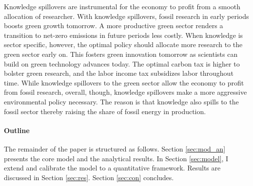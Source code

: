 Knowledge spillovers are instrumental for the economy to profit from a smooth allocation of researcher. With knowledge spillovers, fossil research in early periods boosts green growth tomorrow. A more productive green sector renders a transition to net-zero emissions in future periods less costly. When knowledge is sector specific, however, the optimal policy should allocate more research to the green sector early on. This fosters green innovation tomorrow as scientists can build on green technology advances today. The optimal carbon tax is higher to bolster green research, and the labor income tax subsidizes labor throughout time. While knowledge spillovers to the green sector allow the economy to profit from fossil research, overall, though, knowledge spillovers make a more aggressive environmental policy necessary. The reason is that knowledge also spills to the fossil sector thereby raising the share of fossil energy in production.  %




\paragraph{Outline}
The remainder of the paper is structured as follows. Section \ref{sec:mod_an} presents the core model and the analytical results. In Section \ref{sec:model}, I extend and calibrate the model to a quantitative framework.  Results are discussed in Section \ref{sec:res}. Section \ref{sec:con} concludes.